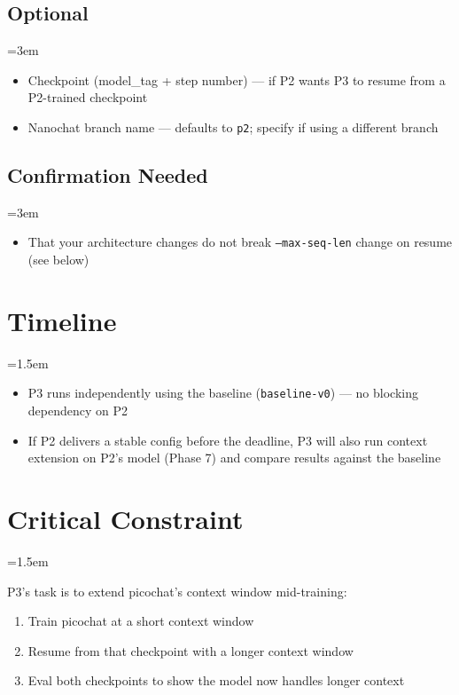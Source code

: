 \documentclass[9pt]{extarticle}
\begin{document}
\subsection*{Optional}
\leftskip=3em

\begin{itemize}[nosep]
  \item Checkpoint (model\_tag + step number) --- if P2 wants P3 to resume from a P2-trained checkpoint
  \item Nanochat branch name --- defaults to \texttt{p2}; specify if using a different branch
\end{itemize}

\subsection*{Confirmation Needed}
\leftskip=3em

\begin{itemize}[nosep]
  \item That your architecture changes do not break \texttt{--max-seq-len} change on resume (see below)
\end{itemize}

\leftskip=0pt
\section*{Timeline}
\leftskip=1.5em

\begin{itemize}[nosep]
  \item P3 runs independently using the baseline (\texttt{baseline-v0}) --- no blocking dependency on P2
  \item If P2 delivers a stable config before the deadline, P3 will also run context extension on P2's model (Phase 7) and compare results against the baseline
\end{itemize}

\leftskip=0pt
\section*{Critical Constraint}
\leftskip=1.5em

P3's task is to extend picochat's context window mid-training:

\begin{enumerate}[nosep]
  \item Train picochat at a short context window
  \item Resume from that checkpoint with a longer context window
  \item Eval both checkpoints to show the model now handles longer context
\end{enumerate}
\end{document}

